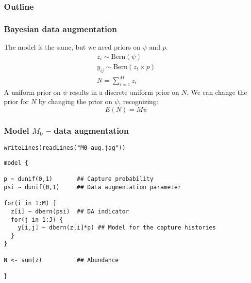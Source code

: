 \documentclass[color=usenames,dvipsnames]{beamer}\usepackage[]{graphicx}\usepackage[]{color}
\makeatletter
\newcommand{\hlstr}[1]{\textcolor[rgb]{0.749,0.012,0.012}{#1}}%
\newcommand{\hlstd}[1]{\textcolor[rgb]{0,0,0}{#1}}%
\newcommand{\hlkwd}[1]{\textcolor[rgb]{0.004,0.004,0.506}{#1}}%
\newenvironment{kframe}{%
 \def\at@end@of@kframe{}%
 \ifinner\ifhmode%
  \def\at@end@of@kframe{\end{minipage}}%
  \begin{minipage}{\columnwidth}%
 \fi\fi%
 \def\FrameCommand##1{\hskip\@totalleftmargin \hskip-\fboxsep
 \colorbox{shadecolor}{##1}\hskip-\fboxsep
     \hskip-\linewidth \hskip-\@totalleftmargin \hskip\columnwidth}%
 \MakeFramed {\advance\hsize-\width
   \@totalleftmargin\z@ \linewidth\hsize
   \@setminipage}}%
 {\par\unskip\endMakeFramed%
 \at@end@of@kframe}
\newenvironment{knitrout}{}{} %
\makeatother
\begin{document}
\begin{frame}
  \frametitle{Outline}
  \Large
\end{frame}



\begin{frame}
  \frametitle{Bayesian data augmentation}
  The model is the same, but we need priors on $\psi$ and $p$. 
  \begin{gather*}
    z_i \sim \mathrm{Bern}(\psi) \\
    y_{ij} \sim \mathrm{Bern}(z_i \times p) \\
    N = \sum_{i=1}^M z_i
  \end{gather*}
  \vfill
  A uniform prior on $\psi$ results in a discrete uniform prior on
  $N$. We can change the prior for $N$ by changing the prior on  
  $\psi$, recognizing:
  \[
    E(N)=M\psi
  \]
\end{frame}



\begin{frame}[fragile]
  \frametitle{Model $M_0$ -- data augmentation}
\vspace{-3pt}
\begin{knitrout}\small
{}\color{fgcolor}\begin{kframe}
\begin{alltt}
\hlkwd{writeLines}\hlstd{(}\hlkwd{readLines}\hlstd{(}\hlstr{"M0-aug.jag"}\hlstd{))}
\end{alltt}
\begin{verbatim}
model {

p ~ dunif(0,1)       ## Capture probability
psi ~ dunif(0,1)     ## Data augmentation parameter

for(i in 1:M) {
  z[i] ~ dbern(psi)  ## DA indicator
  for(j in 1:J) {
    y[i,j] ~ dbern(z[i]*p) ## Model for the capture histories
  }
}

N <- sum(z)          ## Abundance

}
\end{verbatim}
\end{kframe}
\end{knitrout}
\end{frame}
\end{document}
